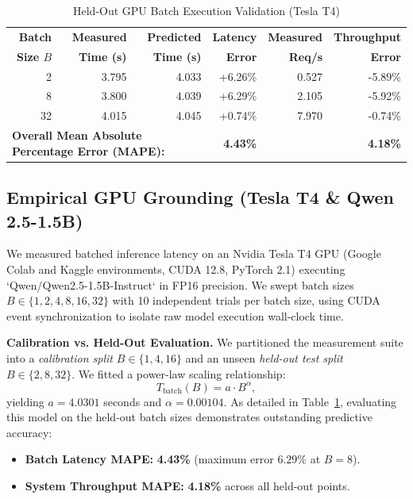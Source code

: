 \documentclass[conference]{IEEEtran}
\begin{document}
\begin{table}[t]
\centering
\caption{Held-Out GPU Batch Execution Validation (Tesla T4)}
\label{tab:gpu_heldout}
\vspace{-0.1cm}
\scriptsize
\setlength{\tabcolsep}{2.2pt}
\begin{tabular}{@{}rrrrrr@{}}
\toprule
\textbf{Batch} & \textbf{Measured} & \textbf{Predicted} & \textbf{Latency} & \textbf{Measured} & \textbf{Throughput} \\
\textbf{Size $B$} & \textbf{Time (s)} & \textbf{Time (s)} & \textbf{Error} & \textbf{Req/s} & \textbf{Error} \\
\midrule
2 & 3.795 & 4.033 & +6.26\% & 0.527 & -5.89\% \\
8 & 3.800 & 4.039 & +6.29\% & 2.105 & -5.92\% \\
32 & 4.015 & 4.045 & +0.74\% & 7.970 & -0.74\% \\
\midrule
\multicolumn{3}{l}{\textbf{Overall Mean Absolute Percentage Error (MAPE):}} & \textbf{4.43\%} & & \textbf{4.18\%} \\
\bottomrule
\end{tabular}
\vspace{-0.2cm}
\end{table}

\subsection{Empirical GPU Grounding (Tesla T4 \& Qwen 2.5-1.5B)}
We measured batched inference latency on an Nvidia Tesla T4 GPU (Google Colab and Kaggle environments, CUDA 12.8, PyTorch 2.1) executing `Qwen/Qwen2.5-1.5B-Instruct` in FP16 precision. We swept batch sizes $B \in \{1, 2, 4, 8, 16, 32\}$ with 10 independent trials per batch size, using CUDA event synchronization to isolate raw model execution wall-clock time.

\textbf{Calibration vs. Held-Out Evaluation.} We partitioned the measurement suite into a \emph{calibration split} $B \in \{1, 4, 16\}$ and an unseen \emph{held-out test split} $B \in \{2, 8, 32\}$. We fitted a power-law scaling relationship:
\begin{equation}
T_{\text{batch}}(B) = a \cdot B^\alpha,
\end{equation}
yielding $a = 4.0301$ seconds and $\alpha = 0.00104$. As detailed in Table~\ref{tab:gpu_heldout}, evaluating this model on the held-out batch sizes demonstrates outstanding predictive accuracy:
\begin{itemize}
    \item \textbf{Batch Latency MAPE:} \textbf{4.43\%} (maximum error $6.29\%$ at $B=8$).
    \item \textbf{System Throughput MAPE:} \textbf{4.18\%} across all held-out points.
\end{itemize}
\end{document}
